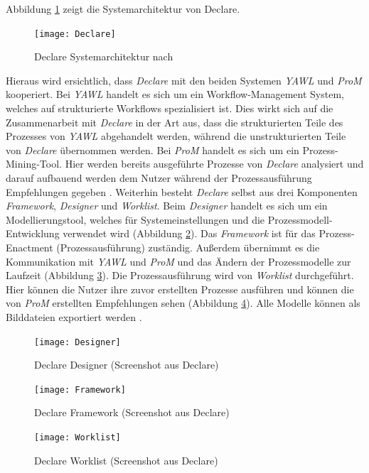 Abbildung \ref{fig:Declare} zeigt die Systemarchitektur von Declare.

\begin{figure}[H]
\begin{center}
  \texttt{[image: Declare]} %
  \caption{Declare Systemarchitektur nach \cite{pesic2007declare}}
  \label{fig:Declare}
\end{center}
\end{figure} 

Hieraus wird ersichtlich, dass \textit{Declare} mit den beiden Systemen \textit{YAWL} und \textit{ProM} kooperiert. Bei \textit{YAWL} handelt es sich um ein Workflow-Management System, welches auf strukturierte Workflows spezialisiert ist. Dies wirkt sich auf die Zusammenarbeit mit \textit{Declare} in der Art aus, dass die strukturierten Teile des Prozesses von \textit{YAWL} abgehandelt werden, während die unstrukturierten Teile von \textit{Declare} übernommen werden. Bei \textit{ProM} handelt es sich um ein Prozess-Mining-Tool. Hier werden bereits ausgeführte Prozesse von \textit{Declare} analysiert und darauf aufbauend werden dem Nutzer während der Prozessausführung Empfehlungen gegeben \cite{pesic2007declare}. \newline
Weiterhin besteht \textit{Declare} selbst aus drei Komponenten \textit{Framework}, \textit{Designer} und \textit{Worklist}.  Beim \textit{Designer} handelt es sich um ein Modellierungstool, welches für Systemeinstellungen und die Prozessmodell-Entwicklung verwendet wird (Abbildung \ref{fig:Designer}). Das \textit{Framework} ist für das Prozess-Enactment (Prozessausführung) zuständig. Außerdem übernimmt es die Kommunikation mit \textit{YAWL} und \textit{ProM} und das Ändern der Prozessmodelle zur Laufzeit (Abbildung \ref{fig:Framework}). Die Prozessausführung wird von \textit{Worklist} durchgeführt. Hier können die Nutzer ihre zuvor erstellten Prozesse ausführen und können die von \textit{ProM} erstellten Empfehlungen sehen (Abbildung \ref{fig:Worklist}). Alle Modelle können als Bilddateien exportiert werden \cite{pesic2007declare}.



\begin{figure}[H]
\begin{center}
  \texttt{[image: Designer]} %
  \caption{Declare Designer (Screenshot aus Declare)}
  \label{fig:Designer}
\end{center}
\end{figure} 


\begin{figure}[H]
\begin{center}
  \texttt{[image: Framework]} %
  \caption{Declare Framework (Screenshot aus Declare)}
  \label{fig:Framework}
\end{center}
\end{figure} 

\begin{figure}[H]
\begin{center}
  \texttt{[image: Worklist]} %
  \caption{Declare Worklist (Screenshot aus Declare)}
  \label{fig:Worklist}
\end{center}
\end{figure} 





 







